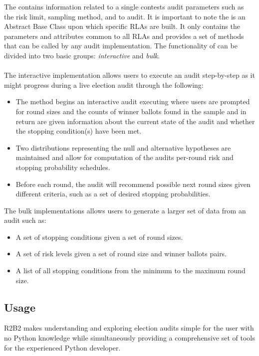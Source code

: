 The  contains information related to a single contests audit parameters
such as the risk limit, sampling method, and  to audit. It is important
to note the  is an Abstract Base Class upon which specific RLAs are built.
It only contains the parameters and attributes common to all RLAs and provides a set
of methods that can be called by any audit implementation. The functionality of
 can be divided into two basic groups: \textit{interactive}
and \textit{bulk}.\\
\\
The interactive implementation allows users to execute an audit step-by-step as it
might progress during a live election audit through the following:

\begin{itemize}
    \item The  method begins an interactive audit executing where users
    are prompted for round sizes and the counts of winner ballots found in the sample
    and in return are given information about the current state of the audit and whether
    the stopping condition(s) have been met.
    \item Two distributions representing the null and alternative hypotheses are maintained
    and allow for computation of the audits per-round risk and stopping probability
    schedules.
    \item Before each round, the audit will recommend possible next round sizes given
    different criteria, such as a set of desired stopping probabilities.
\end{itemize}
The bulk implementations allows users to generate a larger set of data from an audit
such as:

\begin{itemize}
    \item A set of stopping conditions given a set of round sizes.
    \item A set of risk levels given a set of round size and winner ballots pairs.
    \item A list of all stopping conditions from the minimum to the maximum round size.
\end{itemize}

\subsection{Usage}

R2B2 makes understanding and exploring election audits simple for the user with no
Python knowledge while simultaneously providing a comprehensive set of tools for
the experienced Python developer.

